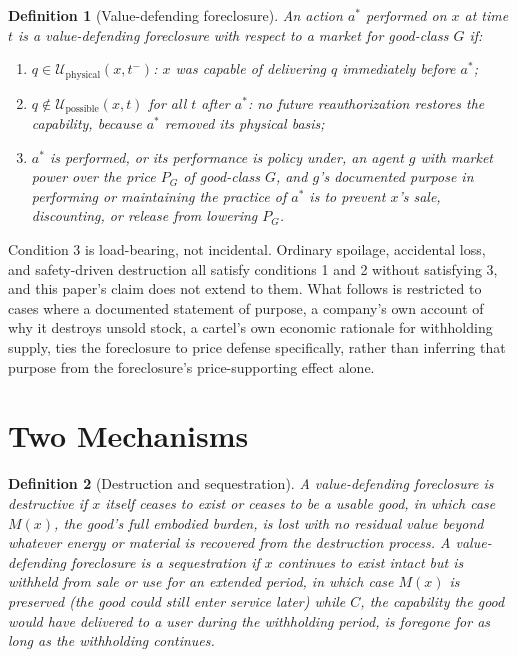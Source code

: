 \documentclass[11pt]{article}
\newtheorem{definition}{Definition}[section]
\begin{document}
\begin{definition}[Value-defending foreclosure]
An action $a^{*}$ performed on $x$ at time $t$ is a \emph{value-defending foreclosure} with respect to a market for good-class $G$ if:
\begin{enumerate}[nosep]
\item $q \in \mathcal{U}_{\text{physical}}(x,t^{-})$: $x$ was capable of delivering $q$ immediately before $a^{*}$;
\item $q \notin \mathcal{U}_{\text{possible}}(x,t)$ for all $t$ after $a^{*}$: no future reauthorization restores the capability, because $a^{*}$ removed its physical basis;
\item $a^{*}$ is performed, or its performance is policy under, an agent $g$ with market power over the price $P_G$ of good-class $G$, and $g$'s documented purpose in performing or maintaining the practice of $a^{*}$ is to prevent $x$'s sale, discounting, or release from lowering $P_G$.
\end{enumerate}
\end{definition}

Condition 3 is load-bearing, not incidental. Ordinary spoilage, accidental loss, and safety-driven destruction all satisfy conditions 1 and 2 without satisfying 3, and this paper's claim does not extend to them. What follows is restricted to cases where a documented statement of purpose, a company's own account of why it destroys unsold stock, a cartel's own economic rationale for withholding supply, ties the foreclosure to price defense specifically, rather than inferring that purpose from the foreclosure's price-supporting effect alone.

\section{Two Mechanisms}

\begin{definition}[Destruction and sequestration]
A value-defending foreclosure is \emph{destructive} if $x$ itself ceases to exist or ceases to be a usable good, in which case $M(x)$, the good's full embodied burden, is lost with no residual value beyond whatever energy or material is recovered from the destruction process. A value-defending foreclosure is a \emph{sequestration} if $x$ continues to exist intact but is withheld from sale or use for an extended period, in which case $M(x)$ is preserved (the good could still enter service later) while $C$, the capability the good would have delivered to a user during the withholding period, is foregone for as long as the withholding continues.
\end{definition}
\end{document}
